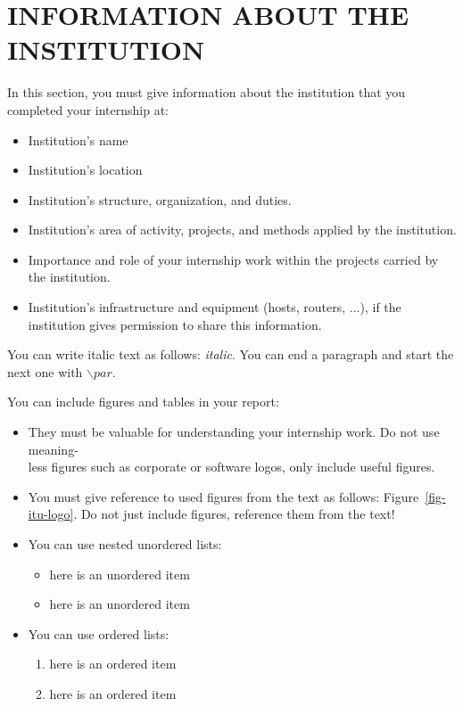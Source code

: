 \documentclass[12pt]{article}
\begin{document}
\section{INFORMATION ABOUT THE INSTITUTION}
\label{sec-institute-info}
\par %
In this section,  you must give information about the 
institution that you completed your internship at: 
\begin{itemize}
    \item Institution's name 
    \item Institution's location
    \item Institution's structure, organization, and duties.
    \item Institution’s area of activity, projects, and methods 
          applied by the institution. 
    \item Importance and role of your internship work within 
          the projects carried by the institution.
    \item Institution’s infrastructure and equipment 
          (hosts,  routers,  ...),  if  the institution gives 
          permission to share this information.
\end{itemize}

You can write italic text as follows: \textit{italic}. You can end a paragraph and start the next one with $\backslash par$.
\par %
You can include figures and tables in your report:
\begin{itemize}
    \item They must be valuable for understanding your 
          internship work. 
          Do not use meaning-\\less figures such as corporate 
          or software logos, only include useful figures. 

    \item You must give reference to used figures from 
          the text as follows: Figure~\ref{fig-itu-logo}.
          Do not just include figures, reference them from the text! 

    \item You can use nested unordered lists:
          \begin{itemize}
             \item here is an unordered item 
             \item here is an unordered item 
          \end{itemize}
    \item You can use ordered lists:
          \begin{enumerate}
             \item here is an ordered item 
             \item here is an ordered item 
          \end{enumerate}
\end{itemize}
\end{document}
